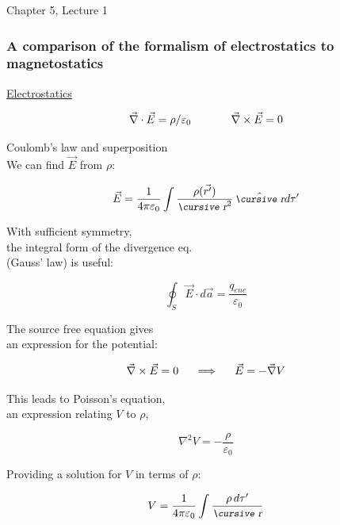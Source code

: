 \documentclass[12pt]{article}
\begin{document}
\begin{flushright} {\color{blue} Chapter 5, Lecture 1} \end{flushright}
\begin{flushleft}

\subsubsection*{\bf A comparison of the formalism of electrostatics to magnetostatics}

\begin{multicols}{2}
\def\columnseprulecolor{\color{grey}}
\begin{center} \underline{Electrostatics} \end{center}

\[
\vec{\nabla} \cdot \vec{E}  = \rho/\varepsilon_{0}   \hspace{.5in} \vec{\nabla} \times \vec{E} = 0
\]

Coulomb's law and superposition \\
We can find $\vec{E}$ from $\rho$:

\[
\vec{E}  = \frac{1}{4\pi \varepsilon_{0}} \int \frac{ \rho( \vec{r^{\prime}} ) }{\text{\small\slshape\cursive r}^{2}} \, \hat{\text{\small\slshape\cursive r}} d\tau^{\prime} 
\]

\vspace{.2in}
With sufficient symmetry,\\
the integral form of the divergence eq.\\
(Gauss' law) is useful:

\[
\oint_{S} \vec{E} \cdot d\vec{a} = \frac{q_{enc}}{\varepsilon_{0}}
\]

\vspace{.2in}
The source free equation gives\\
 an expression for the potential:
 
\[
\vec{\nabla} \times \vec{E} = 0  \hspace{.2in} \Longrightarrow \hspace{.2in} \vec{E} = -\vec{\nabla} V
\]

This leads to Poisson's equation,\\
an expression relating $V$ to $\rho$,

\[
\nabla^{2} V = -\frac{\rho}{\varepsilon_{0}}
\]

Providing a solution for $V$ in terms of $\rho$:

\[
V = \frac{1}{4\pi \varepsilon_{0}} \int \frac{\rho \, d\tau^{\prime}}{\text{\small\slshape\cursive r}} 
\]


\end{multicols}
\end{flushleft}
\end{document}
